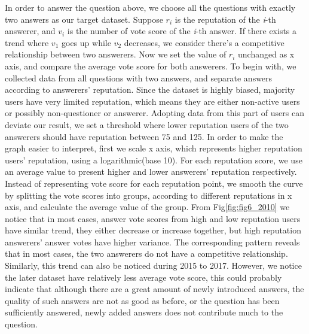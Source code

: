 In order to answer the question above, we choose all the questions with exactly two answers as our target dataset. Suppose $r_{i}$ is the reputation of the \textit{i}-th answerer, and $v_{i}$ is the number of vote score of the \textit{i}-th answer. If there exists a trend where $v_{1}$ goes up while $v_{2}$ decreases, we consider there's a competitive relationship between two answerers. Now we set the value of $r_{i}$ unchanged as x axis, and compare the average vote score for both answerers. To begin with, we collected data from all questions with two answers, and separate answers according to answerers' reputation. Since the dataset is highly biased, majority users have very limited reputation, which means they are either non-active users or possibly non-questioner or answerer. Adopting data from this part of users can deviate our result, we set a threshold where lower reputation users of the two answerers should have reputation between 75 and 125. In order to make the graph easier to interpret, first we scale x axis, which represents higher reputation users' reputation, using a logarithmic(base 10). For each reputation score, we use an average value to present higher and lower answerers' reputation respectively. Instead of representing vote score for each reputation point, we smooth the curve by splitting the vote scores into groups, according to different reputations in x axis, and calculate the average value of the group. From Fig\ref{fig:fig6_2010} we notice that in most cases, answer vote scores from high and low reputation users have similar trend, they either decrease or increase together, but high reputation answerers' answer votes have higher variance. The corresponding pattern reveals that in most cases, the two answerers do not have a competitive relationship. Similarly, this trend can also be noticed during 2015 to 2017. However, we notice the later dataset have relatively less average vote score, this could probably indicate that although there are a great amount of newly introduced answers, the quality of such answers are not as good as before, or the question has been sufficiently answered, newly added answers does not contribute much to the question. 